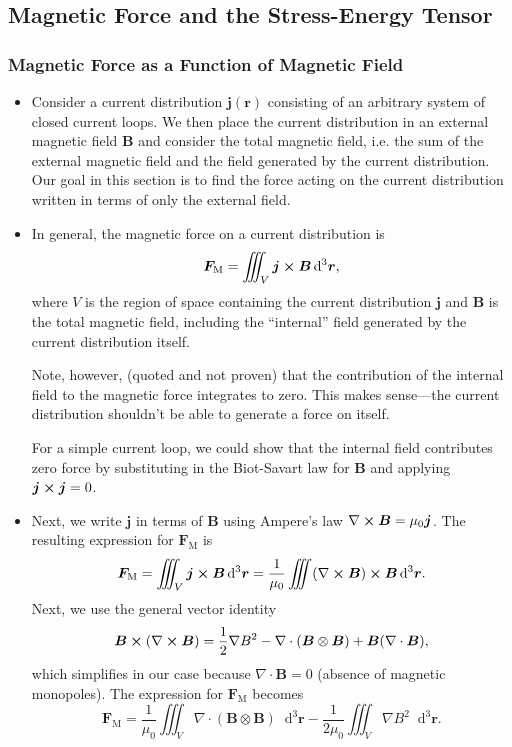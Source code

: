 \documentclass[11pt, a4paper]{article}
\newcommand{\diff}{\mathop{}\!\mathrm{d}} %
\newcommand{\dr}{\diff^{3} \r}  %
\renewcommand{\vec}[1]{\bm{#1}} %
\renewcommand{\r}{\vec{r}}
\newcommand{\B}{\vec{B}} %
\newcommand{\mm}{\mu_{0}}  %
\renewcommand{\j}{\vec{j}}  %
\renewcommand{\div}{\nabla \cdot}
\renewcommand{\curl}{\nabla \cross}
\renewcommand{\grad}{\nabla}
\begin{document}
\subsection{Magnetic Force and the Stress-Energy Tensor}

\subsubsection{Magnetic Force as a Function of Magnetic Field}

\begin{itemize}
	\item Consider a current distribution $ \j(\r) $ consisting of an arbitrary system of closed current loops. We then place the current distribution in an external magnetic field $ \B $ and consider the total magnetic field, i.e. the sum of the external magnetic field and the field generated by the current distribution. Our goal in this section is to find the force acting on the current distribution written in terms of only the external field. 
	
	\item In general, the magnetic force on a current distribution is
	\begin{equation*}
		\vec{F}_{\text{M}} = \iiint_{V}\j \cross \B \dr,
	\end{equation*}
	where $ V $ is the region of space containing the current distribution $ \j $ and $ \B $ is the total magnetic field, including the ``internal'' field generated by the current distribution itself. 

    Note, however, (quoted and not proven) that the contribution of the internal field to the magnetic force integrates to zero. This makes sense---the current distribution shouldn't be able to generate a force on itself. 

    For a simple current loop, we could show that the internal field contributes zero force by substituting in the Biot-Savart law for $ \B $ and applying $ \j \cross \j = 0 $. 
	
    \item Next, we write $ \j $ in terms of $ \B $ using Ampere's law $ \curl \B = \mm \j $. The resulting expression for $ \vec{F}_{\text{M}} $ is
	\begin{equation*}
		\vec{F}_{\text{M}} = \iiint_{V}\j \cross \B \dr = \frac{1}{\mm}\iiint (\curl \B) \cross \B \dr.
	\end{equation*}
	Next, we use the general vector identity
	\begin{equation*}
		\B \cross (\curl \B) = \frac{1}{2}\grad B^{2} - \div (\B \otimes \B) + \B(\div \B),
	\end{equation*}
	which simplifies in our case because $ \div \B = 0 $ (absence of magnetic monopoles). The expression for $ \vec{F}_{\text{M}} $ becomes
	\begin{equation*}
		\vec{F}_{\text{M}} = \frac{1}{\mm}\iiint_{V} \div (\B \otimes \B)\dr - \frac{1}{2\mm}\iiint_{V} \grad B^{2}\dr.
	\end{equation*}
	

\end{itemize}
\end{document}
